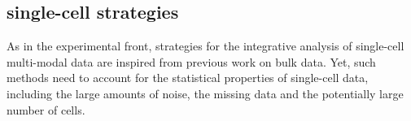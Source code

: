 



\subsection{single-cell strategies}
As in the experimental front, strategies for the integrative analysis of single-cell multi-modal data are inspired from previous work on bulk data. Yet, such methods need to account for the statistical properties of single-cell data, including the large amounts of noise, the missing data and the potentially large number of cells.\\

